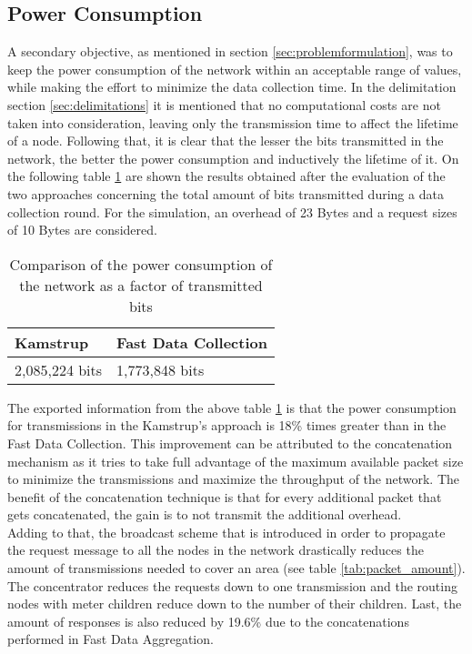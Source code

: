 \subsection{Power Consumption}
A secondary objective, as mentioned in section \ref{sec:problemformulation}, was to keep the power consumption of the network within an acceptable range of values, while making the effort to minimize the data collection time. In the delimitation section \ref{sec:delimitations} it is mentioned that no computational costs are not taken into consideration, leaving only the transmission time to affect the lifetime of a node. Following that, it is clear that the lesser the bits transmitted in the network, the better the power consumption and inductively the lifetime of it. On the following table \ref{tab:power_consumption} are shown the results obtained after the evaluation of the two approaches concerning the total amount of bits transmitted during a data collection round. For the simulation, an overhead of 23 Bytes and a request sizes of 10 Bytes are considered.

\begin{table}[H]
\begin{center}
    \begin{tabular}{ | l | l |}
    \hline
    Kamstrup & Fast Data Collection \\ \hline
     2,085,224 bits & 1,773,848 bits \\ \hline
    \end{tabular}
\end{center}
\caption{Comparison of the power consumption of the network as a factor of transmitted bits}
\label{tab:power_consumption}
\end{table}

The exported information from the above table \ref{tab:power_consumption} is that the power consumption for transmissions in the Kamstrup's approach is 18\% times greater than in the Fast Data Collection. This improvement can be attributed to the concatenation mechanism as it tries to take full advantage of the maximum available packet size to minimize the transmissions and maximize the throughput of the network. The benefit of the concatenation technique is that for every additional packet that gets concatenated, the gain is to not transmit the additional overhead.\\
Adding to that, the broadcast scheme that is introduced in order to propagate the request message to all the nodes in the network drastically reduces the amount of transmissions needed to cover an area (see table \ref{tab:packet_amount}). The concentrator reduces the requests down to one transmission and the routing nodes with meter children reduce down to the number of their children. Last, the amount of responses is also reduced by 19.6\% due to the concatenations performed in Fast Data Aggregation.

